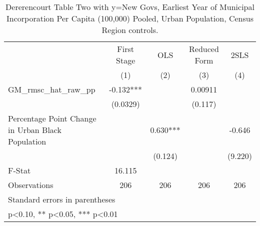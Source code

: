 \begin{table}[htbp]\centering
\def\sym#1{\ifmmode^{#1}\else\(^{#1}\)\fi}
\caption{Dererencourt Table Two with y=New Govs, Earliest Year of Municipal Incorporation Per Capita (100,000) Pooled, Urban Population, Census Region controls.}
\begin{tabular}{l*{4}{c}}
\toprule
                    & First Stage   &         OLS   &Reduced Form   &        2SLS   \\
                    &\multicolumn{1}{c}{(1)}   &\multicolumn{1}{c}{(2)}   &\multicolumn{1}{c}{(3)}   &\multicolumn{1}{c}{(4)}   \\
\midrule
GM\_rmsc\_hat\_raw\_pp  &      -0.132***&               &     0.00911   &               \\
                    &    (0.0329)   &               &     (0.117)   &               \\
\addlinespace
Percentage Point Change in Urban Black Population&               &       0.630***&               &      -0.646   \\
                    &               &     (0.124)   &               &     (9.220)   \\
\midrule
F-Stat              &      16.115   &               &               &               \\
Observations        &         206   &         206   &         206   &         206   \\
\bottomrule
\multicolumn{5}{l}{\footnotesize Standard errors in parentheses}\\
\multicolumn{5}{l}{\footnotesize * p<0.10, ** p<0.05, *** p<0.01}\\
\end{tabular}
\end{table}
